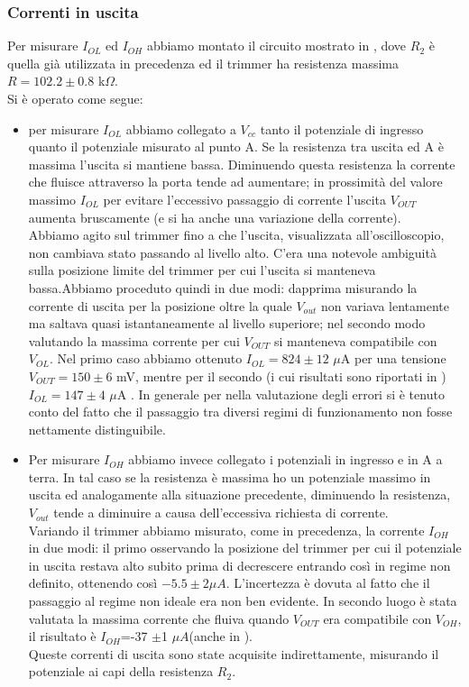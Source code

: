 \subsubsection{Correnti in uscita}
Per misurare $I_{OL}$ ed $I_{OH}$ abbiamo montato il circuito mostrato in , dove $R_2$ è quella già utilizzata in precedenza ed il trimmer ha resistenza massima $R = 102.2 \pm 0.8$ k$\Omega$.\\
Si è operato come segue:
\begin{itemize}
\item per misurare $I_{OL}$ abbiamo collegato a $V_{cc}$ tanto il potenziale di ingresso quanto il potenziale misurato al punto A. 
Se la resistenza tra uscita ed A è massima l'uscita si mantiene bassa. Diminuendo questa resistenza la corrente che fluisce attraverso la porta tende ad aumentare; in prossimità del valore massimo $I_{OL}$ per evitare l'eccessivo passaggio di corrente l'uscita $V_{OUT}$ aumenta bruscamente (e si ha anche una variazione della corrente).\\
 Abbiamo agito sul trimmer fino a che l'uscita, visualizzata all'oscilloscopio, non cambiava stato passando al livello alto. C'era una notevole ambiguità sulla posizione limite del trimmer per cui l'uscita si manteneva bassa.Abbiamo proceduto quindi in due modi: dapprima misurando la corrente di uscita per la posizione oltre la quale $V_{out}$ non variava lentamente ma saltava quasi istantaneamente al livello superiore; nel secondo modo valutando la massima corrente per cui $V_{OUT}$ si manteneva compatibile con $V_{OL}$. Nel primo caso abbiamo ottenuto $I_{OL} = 824 \pm 12$ $\mu$A per una tensione $V_{OUT}=150 \pm 6$ mV, mentre per il secondo (i cui risultati sono riportati in ) $I_{OL} = 147 \pm 4$ $\mu$A .
 In generale per nella valutazione degli errori si è tenuto conto del fatto che il passaggio tra diversi regimi di funzionamento non fosse nettamente distinguibile. 
\item Per misurare $I_{OH}$ abbiamo invece collegato i potenziali in ingresso e in A a terra. In tal caso se la resistenza è massima ho un potenziale massimo in uscita ed analogamente alla situazione precedente, diminuendo la resistenza,  $V_{out}$ tende a diminuire a causa dell'eccessiva richiesta di corrente. \\
Variando il trimmer abbiamo misurato, come in precedenza, la corrente $I_{OH}$ in due modi: il primo osservando la posizione del trimmer per cui il potenziale in uscita restava alto subito prima di decrescere entrando così in regime non definito, ottenendo così $-5.5\pm 2 \mu A$. L'incertezza è dovuta al fatto che il passaggio al regime non ideale era non ben evidente. In secondo luogo è stata valutata la massima corrente che fluiva quando $V_{OUT}$ era compatibile con $V_{OH}$, il risultato è  $I_{OH}$=-37 $\pm$1 $\mu A$(anche in  ).\\
Queste correnti di uscita sono state acquisite indirettamente, misurando il potenziale ai capi della resistenza $R_{2}$.
\end{itemize}
